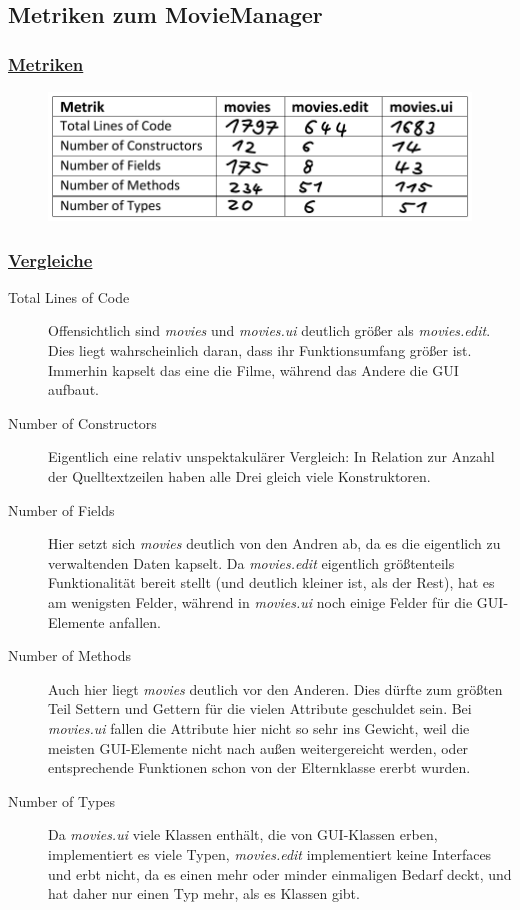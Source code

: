 \documentclass[ngerman]{scrartcl}
\title{\mytitle}
\author{\myauthor}
\newcommand{\blattnummer}{10}												%
\newcommand{\aufgabe}{1}
\begin{document}
	\setcounter{section}{\blattnummer}
	\setcounter{subsection}{\aufgabe-1}
	\subsection{Metriken zum MovieManager}

	\subsubsection*{\underline{Metriken}}
	\begin{figure}[h]
		\centering
		\includegraphics[width=\linewidth]{a101.png}
	\end{figure}

	\subsubsection*{\underline{Vergleiche}}
	\begin{description}
	\item[Total Lines of Code]
		Offensichtlich sind \emph{movies} und \emph{movies.ui} deutlich größer als \emph{movies.edit}. Dies liegt wahrscheinlich daran, dass ihr Funktionsumfang größer ist. Immerhin kapselt das eine die Filme, während das Andere die GUI aufbaut.

	\item[Number of Constructors]
		Eigentlich eine relativ unspektakulärer Vergleich: In Relation zur Anzahl der Quelltextzeilen haben alle Drei gleich viele Konstruktoren.

	\item[Number of Fields]
		Hier setzt sich \emph{movies} deutlich von den Andren ab, da es die eigentlich zu verwaltenden Daten kapselt. Da \emph{movies.edit} eigentlich größtenteils Funktionalität bereit stellt (und deutlich kleiner ist, als der Rest), hat es am wenigsten Felder, während in \emph{movies.ui} noch einige Felder für die GUI-Elemente anfallen.


	\item[Number of Methods]
		Auch hier liegt \emph{movies} deutlich vor den Anderen. Dies dürfte zum größten Teil Settern und Gettern für die vielen Attribute geschuldet sein. Bei \emph{movies.ui} fallen die Attribute hier nicht so sehr ins Gewicht, weil die meisten GUI-Elemente nicht nach außen weitergereicht werden, oder entsprechende Funktionen schon von der Elternklasse ererbt wurden.

	\item[Number of Types]
		Da \emph{movies.ui} viele Klassen enthält, die von GUI-Klassen erben, implementiert es viele Typen, \emph{movies.edit} implementiert keine Interfaces und erbt nicht, da es einen mehr oder minder einmaligen Bedarf deckt, und hat daher nur einen Typ mehr, als es Klassen gibt.
	\end{description}
\end{document}
